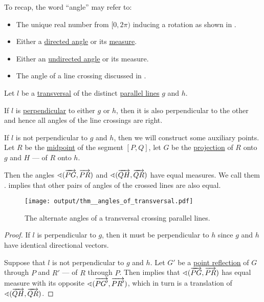 \begin{remark}\label{rem:angle}
  To recap, the word \enquote{angle} may refer to:
  \begin{itemize}
    \item The unique real number from \( [0, 2\pi) \) inducing a rotation as shown in .
    \item Either a \hyperref[def:angle]{directed angle} or its \hyperref[def:angle/measure]{measure}.
    \item Either an \hyperref[def:angle]{undirected angle} or its measure.
    \item The angle of a line crossing discussed in .
  \end{itemize}
\end{remark}

\begin{proposition}\label{thm:angles_of_transversal}
  Let \( l \) be a \hyperref[def:transversal_line]{transversal} of the distinct \hyperref[def:affine_parallelism]{parallel lines} \( g \) and \( h \).

  If \( l \) is \hyperref[def:perpendicularity]{perpendicular} to either \( g \) or \( h \), then it is also perpendicular to the other and hence all angles of the line crossings are right.

  If \( l \) is not perpendicular to \( g \) and \( h \), then we will construct some auxiliary points. Let \( R \) be the \hyperref[thm:segment_midpoint]{midpoint} of the segment \( [P, Q] \), let \( G \) be the \hyperref[def:rigid_motion/projection]{projection} of \( R \) onto \( g \) and \( H \) --- of \( R \) onto \( h \).

  Then the angles \( \sphericalangle(\overrightarrow{PG}, \overrightarrow{PR}) \) and \( \sphericalangle(\overrightarrow{QH}, \overrightarrow{QR}) \) have equal measures. We call them .  implies that other pairs of angles of the crossed lines are also equal.

  \begin{figure}[!ht]
    \centering
    \texttt{[image: output/thm\_\_angles\_of\_transversal.pdf]}
    \caption{The alternate angles of a transversal crossing parallel lines.}\label{fig:thm:angles_of_transversal}
  \end{figure}
\end{proposition}
\begin{proof}
  If \( l \) is perpendicular to \( g \), then it must be perpendicular to \( h \) since \( g \) and \( h \) have identical directional vectors.

  Suppose that \( l \) is not perpendicular to \( g \) and \( h \). Let \( G' \) be a \hyperref[def:rigid_motion/point_reflection]{point reflection} of \( G \) through \( P \) and \( R' \) --- of \( R \) through \( P \). Then  implies that \( \sphericalangle(\overrightarrow{PG}, \overrightarrow{PR}) \) has equal measure with its opposite \( \sphericalangle(\overrightarrow{PG'}, \overrightarrow{PR'}) \), which in turn is a translation of \( \sphericalangle(\overrightarrow{QH}, \overrightarrow{QR}) \).
\end{proof}

